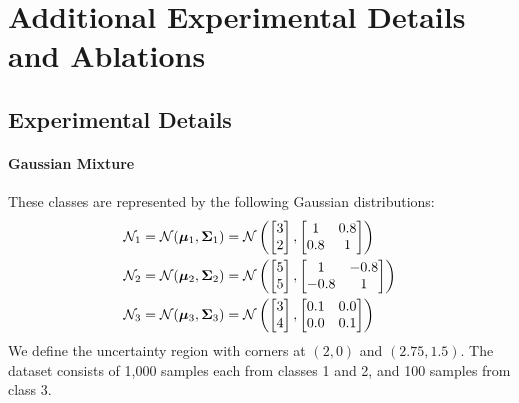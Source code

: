 \section{Additional Experimental Details and Ablations}
\label{app:add_exp}

\subsection{Experimental Details}
\label{app:add_exp_det}

\paragraph{Gaussian Mixture} These classes are represented by the following Gaussian distributions:
\begin{align*}
\mathcal{N}_1 = \mathcal{N}(\boldsymbol{\mu}_1, \boldsymbol{\Sigma}_1) &= \mathcal{N}\left(
\begin{bmatrix}
3 \\
2
\end{bmatrix},
\begin{bmatrix}
1 & 0.8 \\
0.8 & 1
\end{bmatrix}
\right) \notag \\
\mathcal{N}_2 = \mathcal{N}(\boldsymbol{\mu}_2, \boldsymbol{\Sigma}_2) &= \mathcal{N}\left(
\begin{bmatrix}
5 \\
5
\end{bmatrix},
\begin{bmatrix}
1 & -0.8 \\
-0.8 & 1
\end{bmatrix}
\right) \notag \\
\mathcal{N}_3 = \mathcal{N}(\boldsymbol{\mu}_3, \boldsymbol{\Sigma}_3) &= \mathcal{N}\left(
\begin{bmatrix}
3 \\
4
\end{bmatrix},
\begin{bmatrix}
0.1 & 0.0 \\
0.0 & 0.1
\end{bmatrix}
\right)
\end{align*}
We define the uncertainty region with corners at $(2, 0)$ and $(2.75, 1.5)$. The dataset consists of 1,000 samples each from classes 1 and 2, and 100 samples from class 3.

